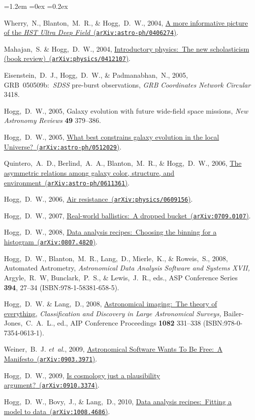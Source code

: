 \documentclass[10pt,letterpaper]{article}
\newcommand{\acronym}[1]{{\small{#1}}}
\newcommand{\foreign}[1]{\textsl{#1}}
\newcommand{\etal}{\foreign{et~al.}}
\newcommand{\project}[1]{\textsl{#1}}
\newcommand{\doi}[2]{\href{http://dx.doi.org/#1}{{#2}}}
\newcommand{\isbn}[1]{{\footnotesize(\acronym{ISBN:}{#1})}}
\newcommand{\arxiv}[2]{\href{http://arxiv.org/abs/#1}{{#2}\ (\texttt{arXiv:#1})}}
\newcounter{refpubnum}
\newcommand{\hogglist}{%
    \rightmargin=0in
    \leftmargin=1.2em
    \topsep=0ex
    \partopsep=0pt
    \itemsep=0.2ex
    \parsep=0pt
    \itemindent=-1.0\leftmargin
    \listparindent=0.0\leftmargin
    \settowidth{\labelsep}{~}
    \usecounter{refpubnum}
  }
\begin{document}
\begin{list}{}{\hogglist}
\item
Wherry,~N., Blanton,~M.~R., \& Hogg,~D.~W., 2004,
\arxiv{astro-ph/0406274}{A more informative picture of the \project{\acronym{HST} Ultra Deep Field}}.
\item
Mahajan,~S. \& Hogg,~D.~W., 2004,
\arxiv{physics/0412107}{Introductory physics:\ The new scholasticism (book review)}.
\item
Eisenstein,~D.~J., Hogg,~D.~W., \& Padmanabhan,~N., 2005,
{\acronym{GRB}~050509b:\ \project{\acronym{SDSS}} pre-burst observations},
\textit{\acronym{GRB} Coordinates Network Circular} 3418.
\item
Hogg,~D.~W., 2005,
{Galaxy evolution with future wide-field space missions},
\textit{New Astronomy Reviews} \textbf{49} 379--386.
\item
Hogg,~D.~W., 2005,
\arxiv{astro-ph/0512029}{What best constrains galaxy evolution in the local Universe?}.
\item
Quintero,~A.~D., Berlind,~A.~A., Blanton,~M.~R., \& Hogg,~D.~W., 2006,
\arxiv{astro-ph/0611361}{The asymmetric relations among galaxy color, structure, and environment}.
\item
Hogg,~D.~W., 2006,
\arxiv{physics/0609156}{Air resistance}.
\item
Hogg,~D.~W., 2007,
\arxiv{0709.0107}{Real-world ballistics:\ A dropped bucket}.
\item
Hogg,~D.~W., 2008,
\arxiv{0807.4820}{Data analysis recipes:\ Choosing the binning for a histogram}.
\item
Hogg,~D.~W., Blanton,~M.~R., Lang,~D., Mierle,~K., \& Roweis,~S., 2008,
{Automated Astrometry},
\textit{Astronomical Data Analysis
Software and Systems XVII,} Argyle,~R.~W, Bunclark,~P.~S., \&
Lewis,~J.~R., eds., ASP Conference Series \textbf{394}, 27--34
\isbn{978-1-58381-658-5}.
\item
Hogg,~D.~W. \& Lang,~D., 2008,
\doi{10.1063/1.3059072}{Astronomical imaging:\ The theory of everything},
\textit{Classification and Discovery in Large Astronomical
Surveys,} Bailer-Jones,~C.~A.~L., ed., AIP Conference Proceedings
\textbf{1082} 331--338 \isbn{978-0-7354-0613-1}.
\item
Weiner,~B.~J. \etal, 2009,
\arxiv{0903.3971}{Astronomical Software Wants To Be Free:\ A Manifesto}.
\item
Hogg,~D.~W., 2009,
\arxiv{0910.3374}{Is cosmology just a plausibility argument?}.
\item
Hogg,~D.~W., Bovy,~J., \& Lang,~D., 2010,
\arxiv{1008.4686}{Data analysis recipes:\ Fitting a model to data}.

\end{list}
\end{document}
